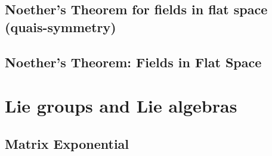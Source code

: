\documentclass{book}
\theoremstyle{definition}
\begin{document}
   
\subsection{Noether's Theorem for fields in flat space (quais-symmetry)}


\subsection{Noether's Theorem: Fields in Flat Space}



































\newpage
\section{Lie groups and Lie algebras}




\subsection{Matrix Exponential}
\end{document}
